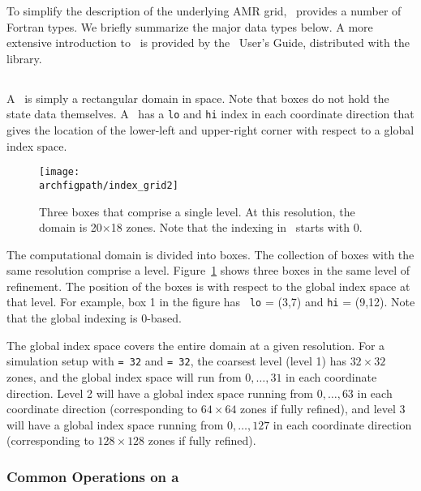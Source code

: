 To simplify the description of the underlying AMR grid, \amrex\
provides a number of Fortran types.  We briefly summarize the major
data types below.  A more extensive introduction to \amrex\ is 
provided by the \amrex\ User's Guide, distributed with the library.


\subsection{\boxtype}

A \boxtype\ is simply a rectangular domain in space.  Note that boxes
do not hold the state data themselves.  A \boxtype\ has a {\tt lo} 
and {\tt hi} index in each coordinate direction that gives the
location of the lower-left and upper-right corner with respect to
a global index space.  

\begin{figure}[t]
\centering
\texttt{[image: \\archfigpath/index\_grid2]}
\caption[Single-level grid structure]
{\label{fig:boxes} Three boxes that comprise a single level.  At this
  resolution, the domain is 20$\times$18 zones.  Note that the
  indexing in \amrex\ starts with $0$.}
\end{figure}


The computational domain is divided into boxes.  The collection of
boxes with the same resolution comprise a level.
Figure~\ref{fig:boxes} shows three boxes in the same level of
refinement.  The position of the boxes is with respect to the global
index space at that level.  For example, box 1 in the figure has {\tt
  lo} = (3,7) and {\tt hi} = (9,12).  Note that the global indexing
is 0-based.

The global index space covers the entire domain at a given resolution.
For a simulation setup with \runparam{n\_cellx} {\tt = 32} and  {\tt =
  32}, the coarsest level (level 1) has $32 \times 32$ zones, and the
global index space will run from $0, \ldots, 31$ in each coordinate
direction.  Level 2 will have a global index space running from $0,
\ldots, 63$ in each coordinate direction (corresponding to $64 \times
64$ zones if fully refined), and level 3 will have a global index
space running from $0, \ldots, 127$ in each coordinate direction
(corresponding to $128\times 128$ zones if fully refined).


\subsubsection{Common Operations on a \boxtype}

